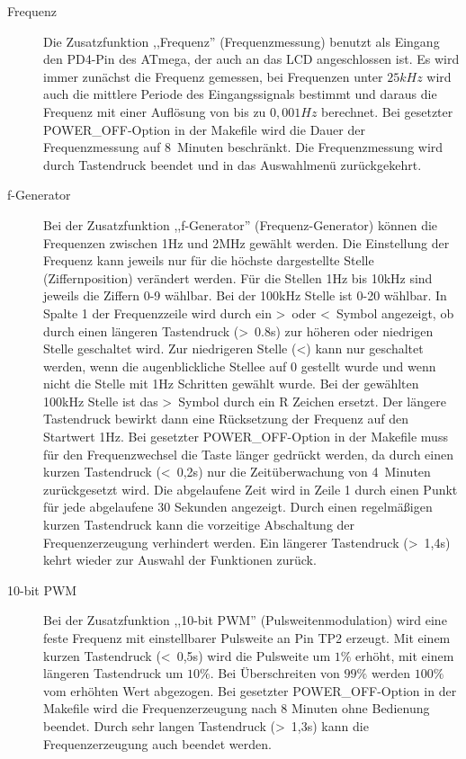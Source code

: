 \begin{description}
 \item[Frequenz]
Die Zusatzfunktion ,,Frequenz'' (Frequenzmessung) benutzt als Eingang den PD4-Pin des ATmega, der auch an das LCD angeschlossen ist.
Es wird immer zunächst die Frequenz gemessen, bei Frequenzen unter \(25kHz\) wird auch die mittlere Periode des Eingangssignals
bestimmt und daraus die Frequenz mit einer Auflösung von bis zu \(0,001Hz\) berechnet.
Bei gesetzter POWER\_OFF-Option in der Makefile wird die Dauer der Frequenzmessung auf 8~Minuten beschränkt.
Die Frequenzmessung wird durch Tastendruck beendet und in das Auswahlmenü zurückgekehrt.\\

 \item[f-Generator]
Bei der Zusatzfunktion ,,f-Generator'' (Frequenz-Generator) können die Frequenzen zwischen 1Hz und 2MHz gewählt werden.
Die Einstellung der Frequenz kann jeweils nur für die höchste dargestellte Stelle (Ziffernposition) verändert werden.
Für die Stellen 1Hz bis 10kHz sind jeweils die Ziffern 0-9 wählbar. Bei der 100kHz Stelle ist 0-20 wählbar.
In Spalte 1 der Frequenzzeile wird durch ein \textgreater~oder \textless~Symbol angezeigt, ob durch einen längeren
Tastendruck (\textgreater~0.8s) zur höheren oder niedrigen Stelle geschaltet wird.
Zur niedrigeren Stelle (\textless) kann nur geschaltet werden, wenn die augenblickliche Stellee auf 0 gestellt wurde
und wenn nicht die Stelle mit 1Hz Schritten gewählt wurde.
Bei der gewählten 100kHz Stelle ist das \textgreater~Symbol durch ein R Zeichen ersetzt. Der längere Tastendruck bewirkt dann eine
Rücksetzung der Frequenz auf den Startwert 1Hz.
Bei gesetzter POWER\_OFF-Option in der Makefile muss für den Frequenzwechsel die Taste länger gedrückt werden, da
durch einen kurzen Tastendruck (\textless~0,2s) nur die Zeitüberwachung von 4~Minuten zurückgesetzt wird.
Die abgelaufene Zeit wird in Zeile 1 durch einen Punkt für jede abgelaufene 30 Sekunden angezeigt.
Durch einen regelmäßigen kurzen Tastendruck kann die vorzeitige Abschaltung der Frequenzerzeugung verhindert werden.
Ein längerer Tastendruck (\textgreater~1,4s) kehrt wieder zur Auswahl der Funktionen zurück.\\

 \item[10-bit PWM]
Bei der Zusatzfunktion ,,10-bit PWM'' (Pulsweitenmodulation) wird eine feste Frequenz mit einstellbarer Pulsweite an Pin TP2 erzeugt.
Mit einem kurzen Tastendruck (\textless~0,5s) wird die Pulsweite um \(1\%\) erhöht, mit einem längeren Tastendruck um \(10\%\).
Bei Überschreiten von \(99\%\) werden \(100\%\) vom erhöhten Wert abgezogen.
Bei gesetzter POWER\_OFF-Option in der Makefile wird die Frequenzerzeugung nach 8 Minuten ohne Bedienung beendet.
Durch sehr langen Tastendruck (\textgreater~1,3s) kann die Frequenzerzeugung auch beendet werden.\\


\end{description}
